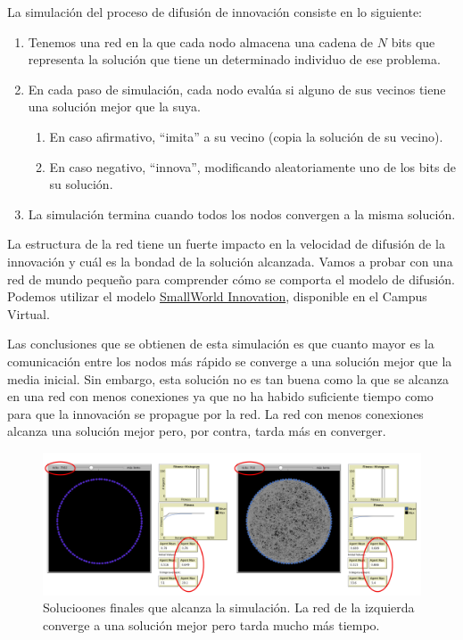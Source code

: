 \documentclass[]{article}
\begin{document}
La simulación del proceso de difusión de innovación consiste en lo
siguiente:

\begin{enumerate}
\def\labelenumi{\arabic{enumi}.}
\itemsep1pt\parskip0pt
\item
  Tenemos una red en la que cada nodo almacena una cadena de \(N\) bits
  que representa la solución que tiene un determinado individuo de ese
  problema.
\item
  En cada paso de simulación, cada nodo evalúa si alguno de sus vecinos
  tiene una solución mejor que la suya.

  \begin{enumerate}
  \def\labelenumii{\arabic{enumii}.}
  \itemsep1pt\parskip0pt
  \item
    En caso afirmativo, ``imita'' a su vecino (copia la solución de su
    vecino).
  \item
    En caso negativo, ``innova'', modificando aleatoriamente uno de los
    bits de su solución.
  \end{enumerate}
\item
  La simulación termina cuando todos los nodos convergen a la misma
  solución.
\end{enumerate}

La estructura de la red tiene un fuerte impacto en la velocidad de
difusión de la innovación y cuál es la bondad de la solución alcanzada.
Vamos a probar con una red de mundo pequeño para comprender cómo se
comporta el modelo de difusión. Podemos utilizar el modelo
\href{http://spark-public.s3.amazonaws.com/sna/netlearn/NetLogo502/SmallWorldInnovation.html}{SmallWorld
Innovation}, disponible en el Campus Virtual.

Las conclusiones que se obtienen de esta simulación es que cuanto mayor
es la comunicación entre los nodos más rápido se converge a una solución
mejor que la media inicial. Sin embargo, esta solución no es tan buena
como la que se alcanza en una red con menos conexiones ya que no ha
habido suficiente tiempo como para que la innovación se propague por la
red. La red con menos conexiones alcanza una solución mejor pero, por
contra, tarda más en converger.

\begin{figure}[htbp]
\centering
\includegraphics{../images/tema08/solSimulacion.png}
\caption{Solucioones finales que alcanza la simulación. La red de la
izquierda converge a una solución mejor pero tarda mucho más tiempo.}
\end{figure}
\end{document}
